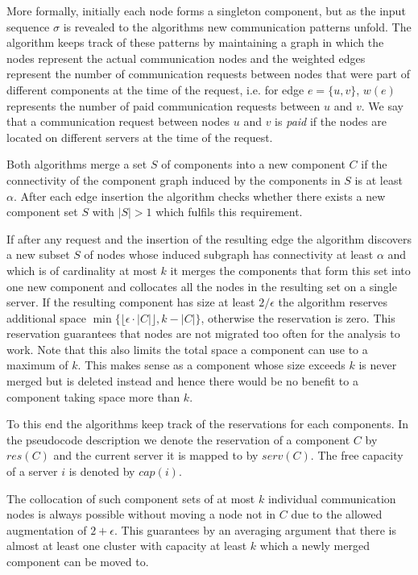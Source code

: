 \documentclass[a4paper,xcolor=dvipsnames, tikz, 12pt]{article}
\theoremstyle{definition}
\begin{document}
	More formally, initially each node forms a singleton component, but as the input sequence $\sigma$ is revealed to the algorithms new communication patterns unfold. The algorithm keeps track of these patterns by maintaining a graph in which the nodes represent the actual communication nodes and the weighted edges represent the number of communication requests between nodes that were part of different components at the time of the request, i.e. for edge $e=\{u,v\}$, $w(e)$ represents the number of paid communication requests between $u$ and $v$. We say that a communication request between nodes $u$ and $v$ is \textit{paid} if the nodes are located on different servers at the time of the request.
	
	Both algorithms merge a set $S$ of components into a new component $C$ if the connectivity of the component graph induced by the components in $S$ is at least $\alpha$. After each edge insertion the algorithm checks whether there exists a new component set $S$ with $|S|>1$ which fulfils this requirement.
	
	If after any request and the insertion of the resulting edge the algorithm discovers a new subset $S$ of nodes whose induced subgraph has connectivity at least $\alpha$ and which is of cardinality at most $k$ it merges the components that form this set into one new component and collocates all the nodes in the resulting set on a single server. If the resulting component has size at least $2/\epsilon$ the algorithm reserves additional space $\min\{\lfloor\epsilon\cdot|C|\rfloor,k-|C|\}$, otherwise the reservation is zero. This reservation guarantees that nodes are not migrated too often for the analysis to work. Note that this also limits the total space a component can use to a maximum of $k$. This makes sense as a component whose size exceeds $k$ is never merged but is deleted instead and hence there would be no benefit to a component taking space more than $k$.
	
	To this end the algorithms keep track of the reservations for each components. In the pseudocode description we denote the reservation of a component $C$ by $res(C)$ and the current server it is mapped to by $serv(C)$. The free capacity of a server $i$ is denoted by $cap(i)$.
	
	The collocation of such component sets of at most $k$ individual communication nodes is always possible without moving a node not in $C$ due to the allowed augmentation of $2+\epsilon$. This guarantees by an averaging argument that there is almost at least one cluster with capacity at least $k$ which a newly merged component can be moved to.
	
\end{document}
